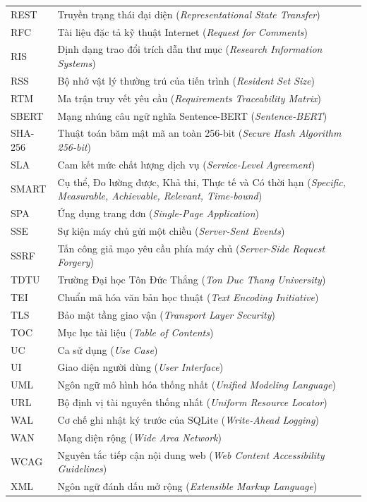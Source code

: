 {\begin{longtable}{P{0.22}P{0.78}}
REST & Truyền trạng thái đại diện (\textit{Representational State Transfer}) \\
RFC & Tài liệu đặc tả kỹ thuật Internet (\textit{Request for Comments}) \\
RIS & Định dạng trao đổi trích dẫn thư mục (\textit{Research Information Systems}) \\
RSS & Bộ nhớ vật lý thường trú của tiến trình (\textit{Resident Set Size}) \\
RTM & Ma trận truy vết yêu cầu (\textit{Requirements Traceability Matrix}) \\
SBERT & Mạng nhúng câu ngữ nghĩa Sentence-BERT (\textit{Sentence-BERT}) \\
SHA-256 & Thuật toán băm mật mã an toàn 256-bit (\textit{Secure Hash Algorithm 256-bit}) \\
SLA & Cam kết mức chất lượng dịch vụ (\textit{Service-Level Agreement}) \\
SMART & Cụ thể, Đo lường được, Khả thi, Thực tế và Có thời hạn (\textit{Specific, Measurable, Achievable, Relevant, Time-bound}) \\
SPA & Ứng dụng trang đơn (\textit{Single-Page Application}) \\
SSE & Sự kiện máy chủ gửi một chiều (\textit{Server-Sent Events}) \\
SSRF & Tấn công giả mạo yêu cầu phía máy chủ (\textit{Server-Side Request Forgery}) \\
TDTU & Trường Đại học Tôn Đức Thắng (\textit{Ton Duc Thang University}) \\
TEI & Chuẩn mã hóa văn bản học thuật (\textit{Text Encoding Initiative}) \\
TLS & Bảo mật tầng giao vận (\textit{Transport Layer Security}) \\
TOC & Mục lục tài liệu (\textit{Table of Contents}) \\
UC & Ca sử dụng (\textit{Use Case}) \\
UI & Giao diện người dùng (\textit{User Interface}) \\
UML & Ngôn ngữ mô hình hóa thống nhất (\textit{Unified Modeling Language}) \\
URL & Bộ định vị tài nguyên thống nhất (\textit{Uniform Resource Locator}) \\
WAL & Cơ chế ghi nhật ký trước của SQLite (\textit{Write-Ahead Logging}) \\
WAN & Mạng diện rộng (\textit{Wide Area Network}) \\
WCAG & Nguyên tắc tiếp cận nội dung web (\textit{Web Content Accessibility Guidelines}) \\
XML & Ngôn ngữ đánh dấu mở rộng (\textit{Extensible Markup Language}) \\
\end{longtable}}

\newpage
{}
\pagestyle{fancy}
